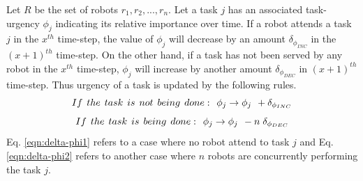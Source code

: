 \documentclass[preprint,12pt]{elsarticle}
\begin{document}
Let $R$ be the set of robots ${r_1, r_2,...,r_n}$. Let a task $j$ has an associated task-urgency $\phi_j$ indicating its relative importance over time.
If a robot attends a task $j$ in the $x^{th}$ time-step, the value of $\phi_j$ will decrease by an amount $\delta_{\phi_{INC}}$ in the $(x+1)^{th}$ time-step.
On the other hand, if a task has not been served by any robot in the $x^{th}$ time-step, $\phi_j$ will increase by another amount  $\delta_{\phi_{DEC}}$  in $(x+1)^{th}$ time-step. Thus
urgency of a task is updated by the following rules.
\begin{equation}
 If\hspace*{0.15cm}the\hspace*{0.15cm} task\hspace*{0.15cm}is\hspace*{0.15cm}not\hspace*{0.15cm}being\hspace*{0.15cm} done:\hspace*{0.15cm}  \phi_j \rightarrow   \phi_j \hspace*{0.15cm} + \delta_{\phi_{INC}}
\label{eqn:delta-phi1}
\end{equation}
\begin{equation}
 If\hspace*{0.15cm}the \hspace*{0.15cm}task\hspace*{0.15cm}is\hspace*{0.15cm}being\hspace*{0.15cm}done:\hspace*{0.15cm}  \phi_j \rightarrow   \phi_j \hspace*{0.15cm} - n\hspace*{0.10cm}\delta_{\phi_{DEC}}
\label{eqn:delta-phi2}
\end{equation}
Eq. \ref{eqn:delta-phi1} refers to a case where no robot attend to task $j$ and Eq. \ref{eqn:delta-phi2} refers to another case where $n$ robots are concurrently performing the task $j$.
\end{document}
